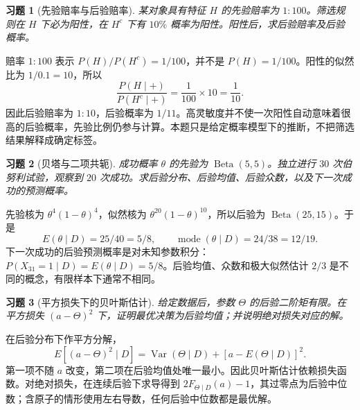 \documentclass[UTF8,12pt,a4paper,fontset=fandol]{ctexart}
\newtheorem{exercise}{习题}[section]
\begin{document}
\begin{exercise}[先验赔率与后验赔率]\label{q:M-E2-II3}
某对象具有特征 $H$ 的先验赔率为 $1:100$。筛选规则在 $H$ 下必为阳性，在 $H^c$ 下有 $10\%$ 概率为阳性。阳性后，求后验赔率及后验概率。\par{}
\end{exercise}

\begin{solve}\label{a:M-E2-II3}赔率 $1:100$ 表示 $P(H)/P(H^c)=1/100$，并不是 $P(H)=1/100$。阳性的似然比为 $1/0.1=10$，所以\[\frac{P(H\mid+)}{P(H^c\mid+)}=\frac1{100}\times10=\frac1{10}.\]因此后验赔率为 $1:10$，后验概率为 $1/11$。高灵敏度并不使一次阳性自动意味着很高的后验概率，先验比例仍参与计算。本题只是给定概率模型下的推断，不把筛选结果解释成确定标签。\end{solve}

\begin{exercise}[贝塔与二项共轭]\label{q:M-F-C14}
成功概率 $\theta$ 的先验为 $\operatorname{Beta}(5,5)$。独立进行 $30$ 次伯努利试验，观察到 $20$ 次成功。求后验分布、后验均值、后验众数，以及下一次成功的预测概率。\par{}
\end{exercise}

\begin{solve}\label{a:M-F-C14}先验核为 $\theta^4(1-\theta)^4$，似然核为 $\theta^{20}(1-\theta)^{10}$，所以后验为 $\operatorname{Beta}(25,15)$。于是\[E(\theta\mid D)=25/40=5/8,\qquad\operatorname{mode}(\theta\mid D)=24/38=12/19.\]下一次成功的后验预测概率是对未知参数积分：$P(X_{31}=1\mid D)=E(\theta\mid D)=5/8$。后验均值、众数和极大似然估计 $2/3$ 是不同的概念，有限样本下通常不相同。\end{solve}

\begin{exercise}[平方损失下的贝叶斯估计]\label{q:B12.1}
给定数据后，参数 $\Theta$ 的后验二阶矩有限。在平方损失 $(a-\Theta)^2$ 下，证明最优决策为后验均值；并说明绝对损失对应的解。\par{}
\end{exercise}

\begin{solve}\label{a:B12.1}在后验分布下作平方分解，\[E[(a-\Theta)^2\mid D]=\operatorname{Var}(\Theta\mid D)+[a-E(\Theta\mid D)]^2.\]第一项不随 $a$ 改变，第二项在后验均值处唯一最小。因此贝叶斯估计依赖损失函数。对绝对损失，在连续后验下求导得到 $2F_{\Theta\mid D}(a)-1$，其过零点为后验中位数；含原子的情形使用左右导数，任何后验中位数都是最优解。\end{solve}
\end{document}
